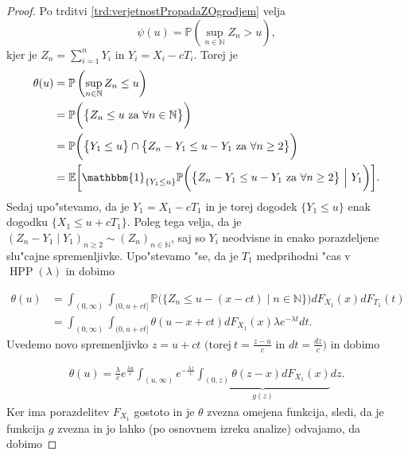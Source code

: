 \documentclass[12pt, a4paper, reqno]{amsart}
\theoremstyle{definition}
\theoremstyle{plain}
\newcommand{\N}{\mathbb{N}}
\newcommand{\E}{\mathbb{E}}
\newcommand{\Prob}{\mathbb{P}}
\newcommand{\1}{\mathds{1}}
\DeclareMathOperator{\HPP}{HPP}
\begin{document}
            \begin{proof}
                Po trditvi \ref{trd:verjetnostPropadaZOgrodjem} velja
                \begin{equation*}
                    \psi(u) = \Prob\left(\sup_{n\in\N}Z_n > u\right),
                \end{equation*}
                kjer je $Z_n = \sum_{i=1}^nY_i$ in $Y_i = X_i - cT_i$. Torej je
                \begin{align*}
                    \theta(u) &= \Prob\left(\sup_{n\in\N}Z_n \leq u\right) \\
                              &= \Prob\biggl(\bigl\{Z_n \leq u \ \text{za} \ \forall n\in\N\bigr\}\biggr) \\
                              &= \Prob\biggl(\bigl\{Y_1 \leq u\bigr\}\cap \bigl\{Z_n - Y_1 \leq u - Y_1 \ \text{za} \ \forall n\geq2\bigr\}\biggr) \\
                              &= \E\biggl[\mathbbm{1}_{\{Y_1\leq u\}}\Prob\biggl(\bigl\{Z_n - Y_1 \leq u - Y_1 \ \text{za} \ \forall n\geq2\bigr\} \ \Big| \ Y_1\biggr)\biggr].
                \end{align*}
                Sedaj upo"stevamo, da je $Y_1 = X_1 - cT_1$ in je torej dogodek $\{Y_1 \leq u\}$ 
                enak dogodku $\{X_1 \leq u + cT_1\}$. Poleg tega velja, da je 
                $(Z_n - Y_1\mid Y_1)_{n\geq2} \sim (Z_n)_{n\in\N}$, saj so $Y_i$ neodvisne in enako porazdeljene
                slu"cajne spremenljivke.
                Upo"stevamo "se, da je  $T_1$ medprihodni "cas v $\HPP(\lambda)$ in dobimo

                \begin{align*}
                        \theta(u)   &= \int_{(0, \infty)}\int_{(0, u + ct]}\Prob\biggl(\bigl\{Z_n \leq u - (x - ct)\mid n\in\N\bigr\}\biggr)dF_{X_1}(x)dF_{T_1}(t) \\
                                    &= \int_{(0, \infty)}\int_{(0, u + ct]}\theta(u - x + ct)dF_{X_1}(x)\lambda e^{-\lambda t}dt.
                \end{align*}
                Uvedemo novo spremenljivko $z = u + ct$ $\bigl( \text{torej} \ t = \tfrac{z - u}{c}$ in $dt = \tfrac{dz}{c} \bigr)$ 
                in dobimo

                \begin{align*}
                            \theta(u) = \frac{\lambda}{c}e^{\frac{\lambda u}{c}}\int_{(u, \infty)}e^{-\frac{\lambda z}{c}}\underbrace{\int_{(0, z)}\theta(z - x)dF_{X_1}(x)}_{g(z)}dz.
                \end{align*}
                Ker ima porazdelitev $F_{X_1}$ gostoto in je $\theta$ zvezna omejena funkcija,
                sledi, da je funkcija $g$ zvezna in jo lahko (po osnovnem izreku analize)
                odvajamo, da dobimo


\end{proof}
\end{document}
